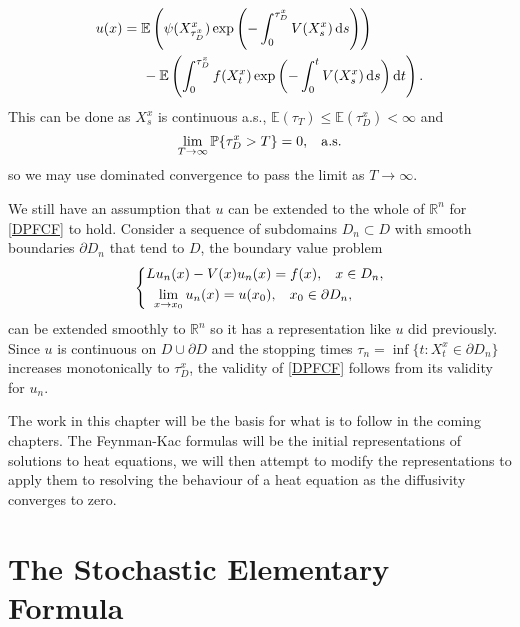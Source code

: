 \documentclass[a4paper,12pt,draft]{report}
\theoremstyle{remark}
\theoremstyle{definition}
\begin{document}
{\begin{align}
u(x) & = \mathbb{E}\left(\psi(X_{\tau_D^x}^x)\exp\left(-\int_0^{\tau_D^x}V(X_s^x)\,\mathrm{d}s\right)\right)\nonumber\\
& \hspace{0.5cm} - \mathbb{E}\left(\int_0^{\tau_D^x}f(X_t^x)\exp\left(-\int_0^tV(X_s^x)\,\mathrm{d}s\right)\mathrm{d}t\right).\nonumber
\end{align}
This can be done as $X_s^x$ is continuous a.s., $\mathbb{E}(\tau_T) \le \mathbb{E}(\tau_D^x) < \infty$ and 
$$
\lim_{T \to \infty}\mathbb{P}\{\tau_D^x > T\} = 0, \hspace{0.3cm} \mathrm{a.s.}
$$
so we may use dominated convergence to pass the limit as $T \to \infty$.

We still have an assumption that $u$ can be extended to the whole of $\mathbb{R}^n$ for \eqref{DPFCF} to hold.  Consider a sequence of subdomains $D_n \subset D$ with smooth boundaries $\partial D_n$ that tend to $D$, the boundary value problem
$$
\left\{
\begin{aligned}
 Lu_n(x) - V(x)u_n(x) & = f(x), \hspace{0.3cm} x \in D_n,\\ 
\lim_{x \to x_0}u_n(x) = u(x_0) & , \hspace{0.3cm} x_0 \in \partial D_n,
\end{aligned}
\right.
$$
can be extended smoothly to $\mathbb{R}^n$ so it has a representation like $u$ did previously.  Since $u$ is continuous on $D \cup \partial D$ and the stopping times $\tau_n = \inf\{t : X_t^x \in \partial D_n\}$ increases monotonically to $\tau_D^x$, the validity of \eqref{DPFCF} follows from its validity for $u_n$.

\qedhere
}

The work in this chapter will be the basis for what is to follow in the coming chapters.  The Feynman-Kac formulas will be the initial representations of solutions to heat equations, we will then attempt to modify the representations to apply them to resolving the behaviour of a heat equation as the diffusivity converges to zero.








\chapter{The Stochastic Elementary Formula}
\end{document}
